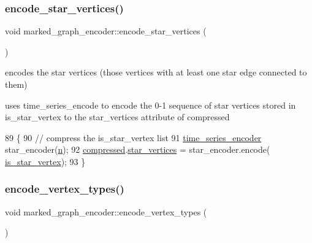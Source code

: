 \subsubsection{\texorpdfstring{encode\+\_\+star\+\_\+vertices()}{encode\_star\_vertices()}}
{\footnotesize\ttfamily void marked\+\_\+graph\+\_\+encoder\+::encode\+\_\+star\+\_\+vertices (\begin{DoxyParamCaption}{ }\end{DoxyParamCaption})\hspace{0.3cm}{\ttfamily [private]}}



encodes the star vertices (those vertices with at least one star edge connected to them) 

uses time\+\_\+series\+\_\+encode to encode the 0-\/1 sequence of star vertices stored in is\+\_\+star\+\_\+vertex to the star\+\_\+vertices attribute of compressed 
\begin{DoxyCode}
89 \{
90   \textcolor{comment}{// compress the is\_star\_vertex list}
91   \hyperlink{classtime__series__encoder}{time\_series\_encoder} star\_encoder(\hyperlink{classmarked__graph__encoder_a4c66d9fdbc14c97523715aac7e4511cb}{n});
92   \hyperlink{classmarked__graph__encoder_ac2ded200860fdd2321f86dd76b28bcb3}{compressed}.\hyperlink{classmarked__graph__compressed_a7a4ced4586e2e353f9076bd447df5208}{star\_vertices} = star\_encoder.encode(
      \hyperlink{classmarked__graph__encoder_a4ce8d85a7b63aed1272ec9824710ce45}{is\_star\_vertex});
93 \}
\end{DoxyCode}
\mbox{\label{classmarked__graph__encoder_a239769085214166e09cb56de750a8d71}} 
\subsubsection{\texorpdfstring{encode\+\_\+vertex\+\_\+types()}{encode\_vertex\_types()}}
{\footnotesize\ttfamily void marked\+\_\+graph\+\_\+encoder\+::encode\+\_\+vertex\+\_\+types (\begin{DoxyParamCaption}{ }\end{DoxyParamCaption})\hspace{0.3cm}{\ttfamily [private]}}



